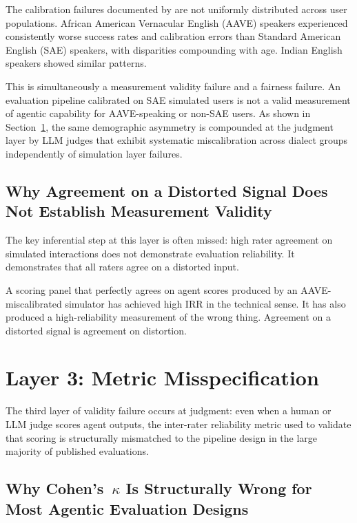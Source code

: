 \documentclass[preprint,12pt]{elsarticle}
\newcommand{\ck}{Cohen's~$\kappa$}
\begin{document}
The calibration failures documented by \citet{seshadri2026} are not uniformly
distributed across user populations. African American Vernacular English (AAVE)
speakers experienced consistently worse success rates and calibration errors than
Standard American English (SAE) speakers, with disparities compounding with age.
Indian English speakers showed similar patterns.

This is simultaneously a measurement validity failure and a fairness failure. An
evaluation pipeline calibrated on SAE simulated users is not a valid measurement of
agentic capability for AAVE-speaking or non-SAE users. As shown in Section~\ref{sec:layer3},
the same demographic asymmetry is compounded at the judgment layer by LLM judges that
exhibit systematic miscalibration across dialect groups independently of simulation
layer failures.

\subsection{Why Agreement on a Distorted Signal Does Not Establish Measurement Validity}
\label{sec:distorted-signal}

The key inferential step at this layer is often missed: high rater agreement on
simulated interactions does not demonstrate evaluation reliability. It demonstrates
that all raters agree on a distorted input.

A scoring panel that perfectly agrees on agent scores produced by an
AAVE-miscalibrated simulator has achieved high IRR in the technical sense. It has
also produced a high-reliability measurement of the wrong thing. Agreement on a
distorted signal is agreement on distortion.

\section{Layer 3: Metric Misspecification}
\label{sec:layer3}

The third layer of validity failure occurs at judgment: even when a human or LLM
judge scores agent outputs, the inter-rater reliability metric used to validate that
scoring is structurally mismatched to the pipeline design in the large majority of
published evaluations.

\subsection{Why \ck{} Is Structurally Wrong for Most Agentic Evaluation Designs}
\label{sec:cohen-kappa}
\end{document}
